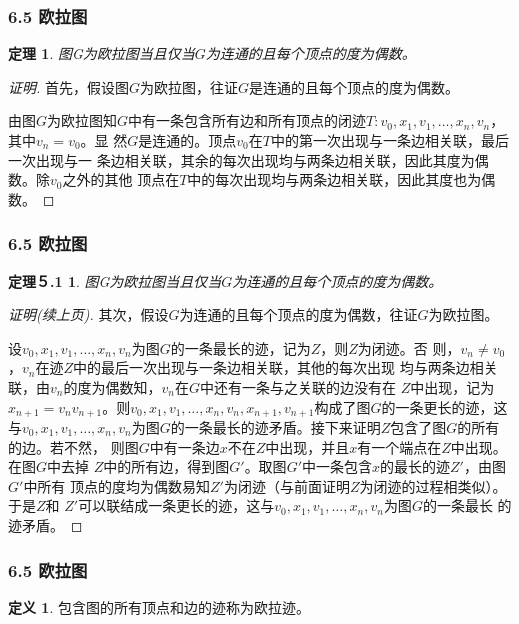 \documentclass{beamer}
\newtheorem{Thm}{定理}[section]
\newtheorem*{Thm2}{定理５.1}
\theoremstyle{definition}
\newtheorem{Def}{定义}[section]
\theoremstyle{example}
\begin{document}
\begin{CJK*}{UTF8}{gbsn}
\begin{frame}
\end{frame}


\begin{frame}
  \frametitle{6.5 欧拉图}
  \begin{Thm}
    图G为欧拉图当且仅当$G$为连通的且每个顶点的度为偶数。
  \end{Thm}
  \begin{proof}[证明]
      首先，假设图$G$为欧拉图，往证$G$是连通的且每个顶点的度为偶数。

  由图$G$为欧拉图知$G$中有一条包含所有边和所有顶点的闭迹$T:v_0,x_1,v_1,\ldots,
  x_n,v_n$，其中$v_n=v_0$。显
  然$G$是连通的。顶点$v_0$在$T$中的第一次出现与一条边相关联，最后一次出现与一
  条边相关联，其余的每次出现均与两条边相关联，因此其度为偶数。除$v_0$之外的其他
  顶点在$T$中的每次出现均与两条边相关联，因此其度也为偶数。

  \end{proof}
\end{frame}

\begin{frame}
  \frametitle{6.5 欧拉图}
  \begin{Thm2}
    图G为欧拉图当且仅当$G$为连通的且每个顶点的度为偶数。
  \end{Thm2}
  \begin{proof}[证明(续上页)]
  其次，假设$G$为连通的且每个顶点的度为偶数，往证$G$为欧拉图。

  设$v_0,x_1,v_1,\ldots, x_n,v_n$为图$G$的一条最长的迹，记为$Z$，则$Z$为闭迹。否
  则，$v_n \neq v_0$，$v_n$在迹$Z$中的最后一次出现与一条边相关联，其他的每次出现
  均与两条边相关联，由$v_n$的度为偶数知，$v_n$在$G$中还有一条与之关联的边没有在
  $Z$中出现，记为$x_{n+1}=v_nv_{n+1}$。则$v_0,x_1,v_1,\ldots,
  x_n,v_n,x_{n+1},v_{n+1}$构成了图$G$的一条更长的迹，这与$v_0,x_1,v_1,\ldots,
  x_n,v_n$为图$G$的一条最长的迹矛盾。接下来证明$Z$包含了图$G$的所有的边。若不然，
  则图$G$中有一条边$x$不在$Z$中出现，并且$x$有一个端点在$Z$中出现。在图$G$中去掉
  $Z$中的所有边，得到图$G'$。取图$G'$中一条包含$x$的最长的迹$Z'$，由图$G'$中所有
  顶点的度均为偶数易知$Z'$为闭迹（与前面证明$Z$为闭迹的过程相类似）。于是$Z$和
  $Z'$可以联结成一条更长的迹，这与$v_0,x_1,v_1,\ldots, x_n,v_n$为图$G$的一条最长
  的迹矛盾。
  \end{proof}
\end{frame}

\begin{frame}
  \frametitle{6.5 欧拉图}
  \begin{Def}
    包含图的所有顶点和边的迹称为\alert{欧拉迹}。
  \end{Def}


\end{frame}
\end{CJK*}
\end{document}
